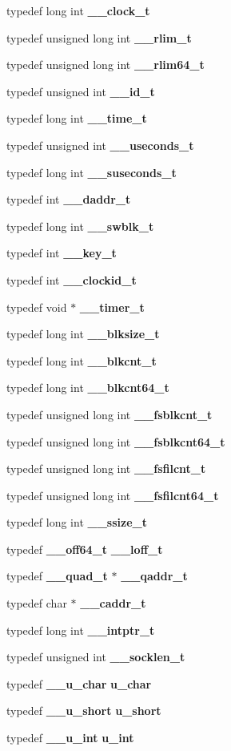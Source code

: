 \begin{DoxyCompactItemize}
typedef long int {\bf \_\-\_\-clock\_\-t}
\item 
typedef unsigned long int {\bf \_\-\_\-rlim\_\-t}
\item 
typedef unsigned long int {\bf \_\-\_\-rlim64\_\-t}
\item 
typedef unsigned int {\bf \_\-\_\-id\_\-t}
\item 
typedef long int {\bf \_\-\_\-time\_\-t}
\item 
typedef unsigned int {\bf \_\-\_\-useconds\_\-t}
\item 
typedef long int {\bf \_\-\_\-suseconds\_\-t}
\item 
typedef int {\bf \_\-\_\-daddr\_\-t}
\item 
typedef long int {\bf \_\-\_\-swblk\_\-t}
\item 
typedef int {\bf \_\-\_\-key\_\-t}
\item 
typedef int {\bf \_\-\_\-clockid\_\-t}
\item 
typedef void $\ast$ {\bf \_\-\_\-timer\_\-t}
\item 
typedef long int {\bf \_\-\_\-blksize\_\-t}
\item 
typedef long int {\bf \_\-\_\-blkcnt\_\-t}
\item 
typedef long int {\bf \_\-\_\-blkcnt64\_\-t}
\item 
typedef unsigned long int {\bf \_\-\_\-fsblkcnt\_\-t}
\item 
typedef unsigned long int {\bf \_\-\_\-fsblkcnt64\_\-t}
\item 
typedef unsigned long int {\bf \_\-\_\-fsfilcnt\_\-t}
\item 
typedef unsigned long int {\bf \_\-\_\-fsfilcnt64\_\-t}
\item 
typedef long int {\bf \_\-\_\-ssize\_\-t}
\item 
typedef {\bf \_\-\_\-off64\_\-t} {\bf \_\-\_\-loff\_\-t}
\item 
typedef {\bf \_\-\_\-quad\_\-t} $\ast$ {\bf \_\-\_\-qaddr\_\-t}
\item 
typedef char $\ast$ {\bf \_\-\_\-caddr\_\-t}
\item 
typedef long int {\bf \_\-\_\-intptr\_\-t}
\item 
typedef unsigned int {\bf \_\-\_\-socklen\_\-t}
\item 
typedef {\bf \_\-\_\-u\_\-char} {\bf u\_\-char}
\item 
typedef {\bf \_\-\_\-u\_\-short} {\bf u\_\-short}
\item 
typedef {\bf \_\-\_\-u\_\-int} {\bf u\_\-int}
\item 

\end{DoxyCompactItemize}
